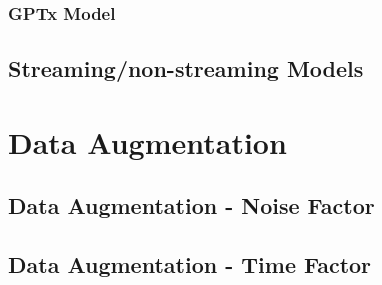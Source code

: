 \subsection{GPTx Model}


\section{Streaming/non-streaming Models}


\chapter{Data Augmentation}
\section{Data Augmentation - Noise Factor}
\section{Data Augmentation - Time Factor}
 

 

 


